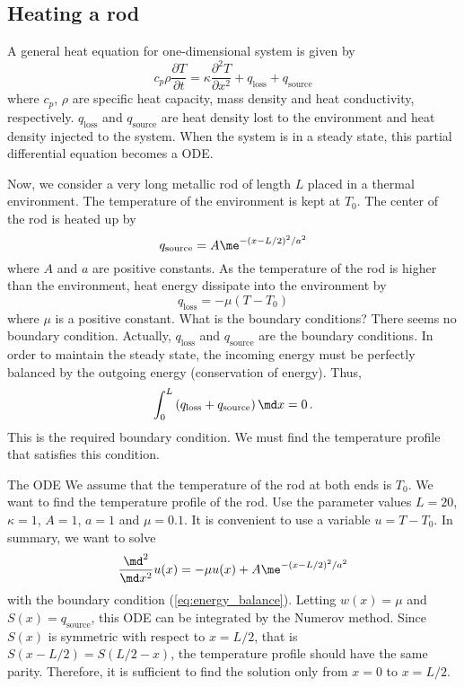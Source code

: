 \subsection{Heating a rod}

A general heat equation for one-dimensional system is given by
\begin{equation}
c_p \rho \frac{\partial T}{\partial t} = \kappa \frac{\partial^2 T}{\partial x^2} + q_\text{loss} + q_\text{source}
\end{equation}
where $c_p$, $\rho$ are specific heat capacity, mass density and heat conductivity, respectively.  $q_\text{loss}$ and $q_\text{source}$ are heat density lost to the environment and heat density injected to the system. When the system is in a steady state, this partial differential equation becomes a ODE.

Now, we consider a very long metallic rod of length $L$ placed in a thermal environment.  The temperature of the environment is kept at $T_0$.
The center of the rod is heated up by
\begin{equation}
q_\text{source} = A \me^{-(x-L/2)^2/a^2} 
\end{equation}
where $A$ and $a$ are positive constants. As the temperature of the rod is higher than the environment, heat energy dissipate into the environment by
\begin{equation}
q_\text{loss} = - \mu (T - T_0)
\end{equation}
where $\mu$ is a positive constant.  What is the boundary conditions?   There seems no boundary condition.  Actually, $q_\text{loss}$ and $q_\text{source}$ are the boundary conditions.  In order to maintain the steady state, the incoming energy must be perfectly balanced by the outgoing energy (conservation of energy).  Thus, 
\begin{equation}\label{eq:energy_balance}
\int_0^L \left ( q_\text{loss} + q_\text{source} \right ) \md x = 0\, .
\end{equation}  
This is the required boundary condition. We must find the temperature profile that satisfies this condition. 

The ODE We assume that the temperature of the rod at both ends is $T_0$.  We want to find the temperature profile of the rod.  Use the parameter values $L=20$, $\kappa=1$, $A=1$, $a=1$ and $\mu=0.1$.  It is convenient to use a variable $u=T-T_0$. In summary, we want to solve 
\begin{equation}
\frac{\md ^2}{\md x^2} u(x) = - \mu u(x) + A \me^{-(x-L/2)^2/a^2}
\end{equation}
with the boundary condition (\ref{eq:energy_balance}).  Letting $w(x)=\mu$ and $S(x)=q_\text{source}$, this ODE can be integrated by the Numerov method.
Since $S(x)$ is symmetric with respect to $x=L/2$, that is $S(x-L/2)=S(L/2-x)$, the temperature profile should have the same parity.
Therefore, it is sufficient to find the solution only from $x=0$ to $x=L/2$.

